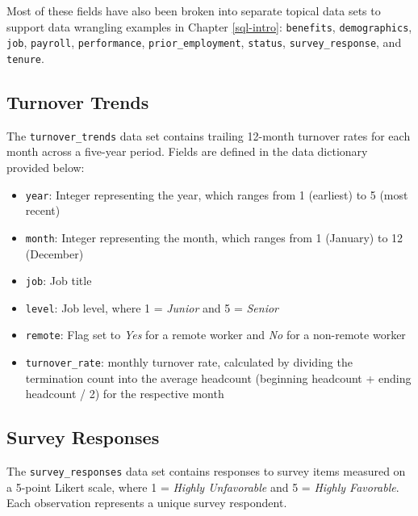 \documentclass[
]{book}
\providecommand{\tightlist}{%
  \setlength{\itemsep}{0pt}\setlength{\parskip}{0pt}}
\begin{document}
Most of these fields have also been broken into separate topical data sets to support data wrangling examples in Chapter \ref{sql-intro}: \texttt{benefits}, \texttt{demographics}, \texttt{job}, \texttt{payroll}, \texttt{performance}, \texttt{prior\_employment}, \texttt{status}, \texttt{survey\_response}, and \texttt{tenure}.

\hypertarget{turnover-trends}{%
\subsection{Turnover Trends}\label{turnover-trends}}

The \texttt{turnover\_trends} data set contains trailing 12-month turnover rates for each month across a five-year period. Fields are defined in the data dictionary provided below:

\begin{itemize}
\tightlist
\item
  \texttt{year}: Integer representing the year, which ranges from 1 (earliest) to 5 (most recent)
\item
  \texttt{month}: Integer representing the month, which ranges from 1 (January) to 12 (December)
\item
  \texttt{job}: Job title
\item
  \texttt{level}: Job level, where 1 = \emph{Junior} and 5 = \emph{Senior}
\item
  \texttt{remote}: Flag set to \emph{Yes} for a remote worker and \emph{No} for a non-remote worker
\item
  \texttt{turnover\_rate}: monthly turnover rate, calculated by dividing the termination count into the average headcount (beginning headcount + ending headcount / 2) for the respective month
\end{itemize}

\hypertarget{survey-responses}{%
\subsection{Survey Responses}\label{survey-responses}}

The \texttt{survey\_responses} data set contains responses to survey items measured on a 5-point Likert scale, where 1 = \emph{Highly Unfavorable} and 5 = \emph{Highly Favorable}. Each observation represents a unique survey respondent.
\end{document}
